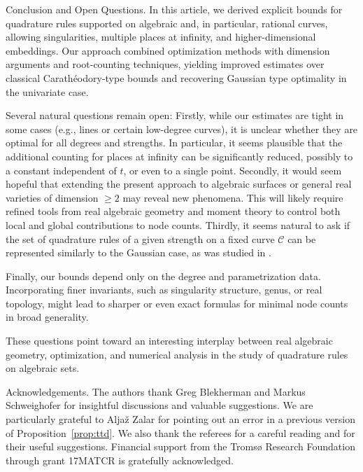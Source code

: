 \documentclass[11pt,a4paper]{amsart}
\makeatletter
\numberwithin{equation}{section}
\theoremstyle{definition}
\numberwithin{thm}{section}
\def\paragraph{\@startsection{paragraph}{4}%
  \z@{.5\linespacing\@plus.7\linespacing}{-.5em}%
  {\normalfont\normalsize\bfseries}}
\theoremstyle{break}
\numberwithin{subcase}{case}
\makeatother
\begin{document}
\paragraph{Conclusion and Open Questions.}
In this article, we derived explicit bounds for quadrature rules supported on algebraic and, in particular, rational curves, allowing singularities, multiple places at infinity, and higher-dimensional embeddings. Our approach combined optimization methods with dimension arguments and root-counting techniques, yielding improved estimates over classical Carathéodory-type bounds and recovering Gaussian type optimality in the univariate case.  

Several natural questions remain open:  Firstly, while our estimates are tight in some cases (e.g., lines or certain low-degree curves), it is unclear whether they are optimal for all degrees and strengths. In particular, it seems plausible that the additional counting for places at infinity can be significantly reduced, possibly to a constant independent of $t$, or even to a single point.  Secondly, it would seem hopeful that extending the present approach to algebraic surfaces or general real varieties of dimension $\ge 2$ may reveal new phenomena. This will likely require refined tools from real algebraic geometry and moment theory to control both local and global contributions to node counts. Thirdly, it seems natural to ask if the set of quadrature rules of a given strength on a fixed curve $\mathcal{C}$ can be represented similarly to the Gaussian case, as was studied in \cite{AHL}.  

Finally, our bounds depend only on the degree and parametrization data. Incorporating finer invariants, such as singularity structure, genus, or real topology, might lead to sharper or even exact formulas for minimal node counts in broad generality.

These questions point toward an interesting  interplay between real algebraic geometry, optimization, and numerical analysis in the study of quadrature rules on algebraic sets.

\paragraph{Acknowledgements.}
The authors thank Greg Blekherman and Markus Schweighofer for insightful discussions and valuable suggestions. We are particularly grateful to Aljaž Zalar for pointing out an error in a previous version of Proposition~\ref{prop:ttd}.  We also thank the referees for a careful reading and for their useful suggestions. Financial support from the Tromsø Research Foundation through grant 17MATCR is gratefully acknowledged.

\printbibliography
\end{document}
